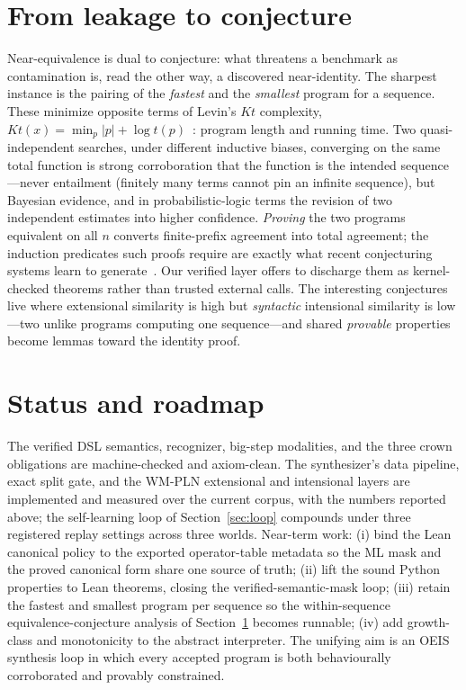 \documentclass[11pt]{article}
\begin{document}
\section{From leakage to conjecture}
\label{sec:conjecture}

Near-equivalence is dual to conjecture: what threatens a benchmark as contamination is, read
the other way, a discovered near-identity. The sharpest instance is the pairing of the
\emph{fastest} and the \emph{smallest} program for a sequence. These minimize opposite terms
of Levin's $Kt$ complexity, $Kt(x)=\min_p |p|+\log t(p)$~\cite{levin1973}: program length
and running time. Two quasi-independent searches, under different inductive biases,
converging on the same total function is strong corroboration that the function is the
intended sequence---never entailment (finitely many terms cannot pin an infinite sequence),
but Bayesian evidence, and in probabilistic-logic terms the revision of two independent
estimates into higher confidence. \emph{Proving} the two programs equivalent on all $n$
converts finite-prefix agreement into total agreement; the induction predicates such proofs
require are exactly what recent conjecturing systems learn to
generate~\cite{gauthier2025}. Our verified layer offers to discharge them as kernel-checked
theorems rather than trusted external calls. The interesting conjectures live where
extensional similarity is high but \emph{syntactic} intensional similarity is low---two
unlike programs computing one sequence---and shared \emph{provable} properties become lemmas
toward the identity proof.

\section{Status and roadmap}
\label{sec:roadmap}

The verified DSL semantics, recognizer, big-step modalities, and the three crown obligations
are machine-checked and axiom-clean. The synthesizer's data pipeline, exact split gate, and
the WM-PLN extensional and intensional layers are implemented and measured over the current
corpus, with the numbers reported above; the self-learning loop of Section~\ref{sec:loop}
compounds under three registered replay settings across three worlds. Near-term work: (i) bind the Lean canonical policy
to the exported operator-table metadata so the ML mask and the proved canonical form share
one source of truth; (ii) lift the sound Python properties to Lean theorems, closing the
verified-semantic-mask loop; (iii) retain the fastest and smallest program per sequence so
the within-sequence equivalence-conjecture analysis of Section~\ref{sec:conjecture} becomes
runnable; (iv) add growth-class and monotonicity to the abstract interpreter. The unifying
aim is an OEIS synthesis loop in which every accepted program is both behaviourally
corroborated and provably constrained.
\end{document}
